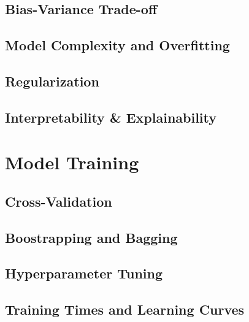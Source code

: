 \documentclass[
]{book}
\begin{document}
\hypertarget{bias-variance-trade-off}{%
\subsection{Bias-Variance Trade-off}\label{bias-variance-trade-off}}

\hypertarget{model-complexity-and-overfitting}{%
\subsection{Model Complexity and Overfitting}\label{model-complexity-and-overfitting}}

\hypertarget{regularization}{%
\subsection{Regularization}\label{regularization}}

\hypertarget{interpretability-explainability}{%
\subsection{Interpretability \& Explainability}\label{interpretability-explainability}}

\hypertarget{model-training}{%
\section{Model Training}\label{model-training}}

\hypertarget{cross-validation}{%
\subsection{Cross-Validation}\label{cross-validation}}

\hypertarget{boostrapping-and-bagging}{%
\subsection{Boostrapping and Bagging}\label{boostrapping-and-bagging}}

\hypertarget{hyperparameter-tuning}{%
\subsection{Hyperparameter Tuning}\label{hyperparameter-tuning}}

\hypertarget{training-times-and-learning-curves}{%
\subsection{Training Times and Learning Curves}\label{training-times-and-learning-curves}}
\end{document}
